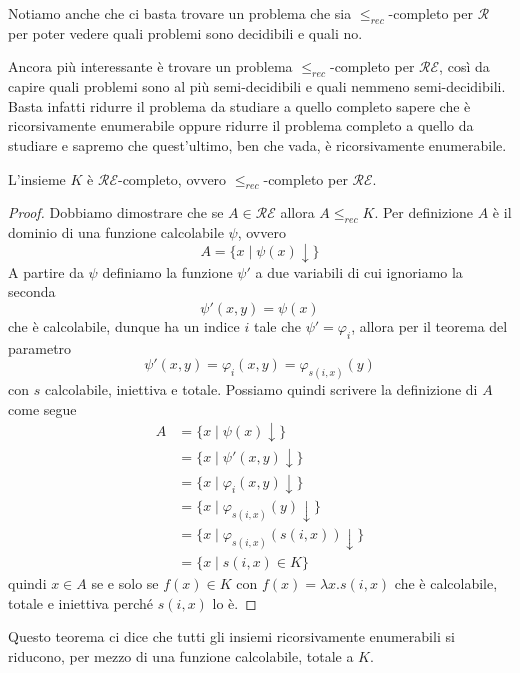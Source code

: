 Notiamo anche che ci basta trovare un problema che sia
$\leq_{rec}$-completo per $\mathcal{R}$ per poter vedere quali
problemi sono decidibili e quali no.

Ancora più interessante è trovare un problema
$\leq_{rec}$-completo per $\mathcal{RE}$, così da capire quali
problemi sono al più semi-decidibili e quali nemmeno
semi-decidibili. Basta infatti ridurre il problema da studiare a
quello completo sapere che è ricorsivamente enumerabile oppure
ridurre il problema completo a quello da studiare e sapremo che
quest'ultimo, ben che vada, è ricorsivamente enumerabile.



\begin{theorem}
	L'insieme $K$ è $\mathcal{RE}$-completo, ovvero
	$\leq_{rec}$-completo per $\mathcal{RE}$.
	\begin{proof}
		Dobbiamo dimostrare che se $A \in \mathcal{RE}$ allora
		$A \leq_{rec} K$. Per definizione $A$ è il dominio di
		una funzione calcolabile $\psi$, ovvero
		\[ A = \{ x \mid \psi (x) \downarrow \} \]
		A partire da $\psi$ definiamo la funzione $\psi'$ a due
		variabili di cui ignoriamo la seconda
		\[ \psi' (x, y) = \psi(x) \]
		che è calcolabile, dunque ha un indice $i$ tale che
		$\psi' = \varphi_i$, allora per il teorema del parametro
		\[ \psi' (x, y) = \varphi_i(x, y) = \varphi_{s(i, x)} (y) \]
		con $s$ calcolabile, iniettiva e totale. Possiamo quindi
		scrivere la definizione di $A$ come segue
		\begin{align*}
			A & = \{ x \mid \psi(x) \downarrow \}                    \\
			  & = \{ x \mid \psi'(x, y) \downarrow \}                \\
			  & = \{ x \mid \varphi_i(x, y) \downarrow \}            \\
			  & = \{ x \mid \varphi_{s(i, x)}(y) \downarrow \}       \\
			  & = \{ x \mid \varphi_{s(i, x)}(s(i, x)) \downarrow \} \\
			  & = \{ x \mid s(i, x) \in K \}
		\end{align*}
		quindi $x \in A$ se e solo se $f(x) \in K$ con
		$f(x) = \lambda x . s(i, x)$ che è calcolabile, totale
		e iniettiva perché $s(i, x)$ lo è.
	\end{proof}
\end{theorem}

Questo teorema ci dice che tutti gli insiemi ricorsivamente
enumerabili si riducono, per mezzo di una funzione calcolabile,
totale a $K$.
